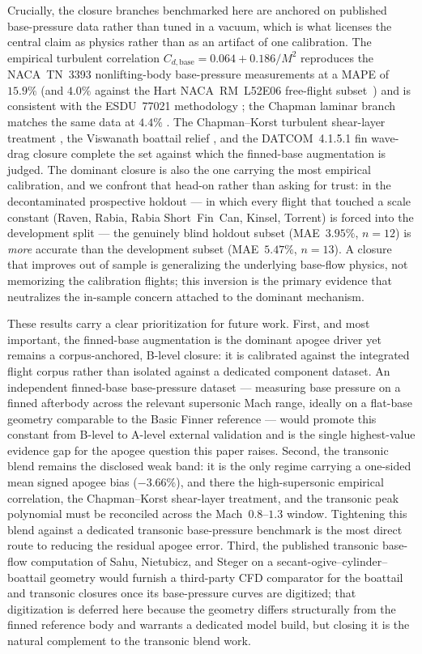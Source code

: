 Crucially, the closure branches benchmarked here are anchored on published
base-pressure data rather than tuned in a vacuum, which is what licenses the
central claim as physics rather than as an artifact of one calibration. The
empirical turbulent correlation $C_{d,\text{base}} = 0.064 + 0.186/M^2$
reproduces the NACA~TN~3393 nonlifting-body base-pressure measurements at a MAPE
of $15.9\%$ (and $4.0\%$ against the Hart NACA~RM~L52E06 free-flight
subset~\cite{hart1952basedrag}) and is consistent with the ESDU~77021
methodology \cite{chapman1955,esdu77021}; the Chapman laminar branch matches
the same data at $4.4\%$ \cite{chapman1950,chapman1955}. The Chapman--Korst turbulent
shear-layer treatment \cite{chapman1958}, the Viswanath boattail relief
\cite{viswanath1996}, and the DATCOM~4.1.5.1 fin wave-drag closure
\cite{datcom1978} complete the set against which the finned-base augmentation
is judged. The dominant closure is also the one carrying the most empirical
calibration, and we confront that head-on rather than asking for trust: in the
decontaminated prospective holdout --- in which every flight that touched a
scale constant (Raven, Rabia, Rabia Short~Fin~Can, Kinsel, Torrent) is forced
into the development split --- the genuinely blind holdout subset (MAE~$3.95\%$,
$n=12$) is \emph{more} accurate than the development subset (MAE~$5.47\%$,
$n=13$). A closure that improves out of sample is generalizing the underlying
base-flow physics, not memorizing the calibration flights; this inversion is
the primary evidence that neutralizes the in-sample concern attached to the
dominant mechanism.

These results carry a clear prioritization for future work. First, and most
important, the finned-base augmentation is the dominant apogee driver yet
remains a corpus-anchored, B-level closure: it is calibrated against the
integrated flight corpus rather than isolated against a dedicated component
dataset. An independent finned-base base-pressure dataset --- measuring base
pressure on a finned afterbody across the relevant supersonic Mach range,
ideally on a flat-base geometry comparable to the Basic Finner reference
\cite{dupuis1997} --- would promote this constant from B-level to A-level
external validation and is the single highest-value evidence gap for the
apogee question this paper raises. Second, the transonic blend remains the
disclosed weak band: it is the only regime carrying a one-sided mean signed
apogee bias ($-3.66\%$), and there the high-supersonic empirical correlation,
the Chapman--Korst shear-layer treatment, and the transonic peak polynomial
must be reconciled across the Mach~$0.8$--$1.3$ window. Tightening this blend
against a dedicated transonic base-pressure benchmark is the most direct route
to reducing the residual apogee error. Third, the published transonic
base-flow computation of Sahu, Nietubicz, and Steger \cite{sahu1983} on a
secant-ogive--cylinder--boattail geometry would furnish a third-party CFD
comparator for the boattail and transonic closures once its base-pressure
curves are digitized; that digitization is deferred here because the geometry
differs structurally from the finned reference body and warrants a dedicated
model build, but closing it is the natural complement to the transonic blend
work.

